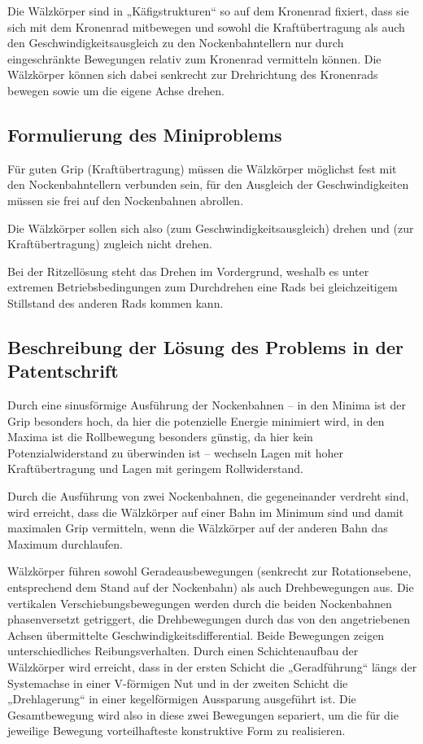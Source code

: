 \documentclass[11pt,a4paper]{article}
\begin{document}
Die Wälzkörper sind in „Käfigstrukturen“ so auf dem Kronenrad fixiert, dass
sie sich mit dem Kronenrad mitbewegen und sowohl die Kraftübertra\-gung als
auch den Geschwindigkeitsausgleich zu den Nockenbahntellern nur durch
eingeschränkte Bewegungen relativ zum Kronenrad vermitteln können.  Die
Wälzkörper können sich dabei senkrecht zur Drehrichtung des Kronenrads bewegen
sowie um die eigene Achse drehen.
  
\subsection{Formulierung des Miniproblems}

Für guten Grip (Kraftübertragung) müssen die Wälzkörper möglichst fest mit den
Nockenbahntellern verbunden sein, für den Ausgleich der Geschwindigkeiten
müssen sie frei auf den Nockenbahnen abrollen.

Die Wälzkörper sollen sich also (zum Geschwindigkeitsausgleich) drehen und
(zur Kraftüber\-tragung) zugleich nicht drehen. 

Bei der Ritzellösung steht das Drehen im Vordergrund, weshalb es unter
extremen Betriebsbedingungen zum Durchdrehen eine Rads bei gleichzeitigem
Stillstand des anderen Rads kommen kann. 

\subsection{Beschreibung der Lösung des Problems in der Patentschrift}

Durch eine sinusförmige Ausführung der Nockenbahnen -- in den Minima ist der
Grip besonders hoch, da hier die potenzielle Energie minimiert wird, in den
Maxima ist die Rollbewegung besonders günstig, da hier kein
Potenzialwiderstand zu überwinden ist -- wechseln Lagen mit hoher
Kraftübertragung und Lagen mit geringem Rollwiderstand.

Durch die Ausführung von zwei Nockenbahnen, die gegeneinander verdreht sind,
wird erreicht, dass die Wälzkörper auf einer Bahn im Minimum sind und damit
maximalen Grip vermitteln, wenn die Wälzkörper auf der anderen Bahn das
Maximum durchlaufen.

Wälzkörper führen sowohl Geradeausbewegungen (senkrecht zur Rotationsebene,
entsprechend dem Stand auf der Nockenbahn) als auch Drehbewegungen aus.  Die
vertikalen Verschiebungsbewegungen werden durch die beiden Nockenbahnen
phasenversetzt getriggert, die Drehbewegungen durch das von den angetriebenen
Achsen übermittelte Geschwindigkeitsdifferential.  Beide Bewegungen zeigen
unterschiedliches Reibungsverhalten.  Durch einen Schichtenaufbau der
Wälzkörper wird erreicht, dass in der ersten Schicht die „Geradführung“ längs
der Systemachse in einer V-förmigen Nut und in der zweiten Schicht die
„Drehlagerung“ in einer kegelförmigen Aussparung ausgeführt ist.  Die
Gesamtbewegung wird also in diese zwei Bewegungen separiert, um die für die
jeweilige Bewegung vorteilhafteste konstruktive Form zu realisieren.
\end{document}
